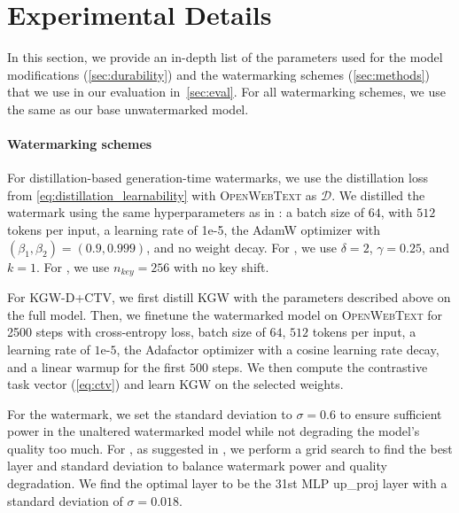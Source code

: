 \section{Experimental Details}
\label{app:experimental_details}

In this section, we provide an in-depth list of the parameters used for the model modifications (\cref{sec:durability}) and the watermarking schemes (\cref{sec:methods}) that we use in our evaluation in~\cref{sec:eval}.
For all watermarking schemes, we use the same \llama as our base unwatermarked model. 

\paragraph{Watermarking schemes}
For distillation-based generation-time watermarks, we use the distillation loss from \cref{eq:distillation_learnability} with \textsc{OpenWebText} as $\mathcal{D}$.  
We distilled the watermark using the same hyperparameters as in \citet{learnability}: a batch size of $64$, with $512$ tokens per input, a learning rate of 1e-5, the AdamW optimizer \citep{adamw} with $(\beta_1, \beta_2) = (0.9,0.999)$, and no weight decay.  
For \KGW, we use $\delta=2$, $\gamma=0.25$, and $k=1$.  
For \KTH, we use $n_{key} = 256$ with no key shift. 

For \textsc{KGW-D+CTV}, we first distill \textsc{KGW} with the parameters described above on the full model.
Then, we finetune the watermarked model on \textsc{OpenWebText} for 2500 steps with cross-entropy loss, batch size of $64$, $512$ tokens per input, a learning rate of $1\text{e-}5$, the Adafactor optimizer with a cosine learning rate decay, and a linear warmup for the first $500$ steps. 
We then compute the contrastive task vector (\cref{eq:ctv}) and learn \textsc{KGW} on the selected weights.

For the \unremovable watermark, we set the standard deviation to $\sigma=0.6$ to ensure sufficient power in the unaltered watermarked model while not degrading the model's quality too much.  
For \gaussmark, as suggested in \citet{gaussmark}, we perform a grid search to find the best layer and standard deviation to balance watermark power and quality degradation.  
We find the optimal layer to be the 31st MLP up\_proj layer with a standard deviation of $\sigma=0.018$.

